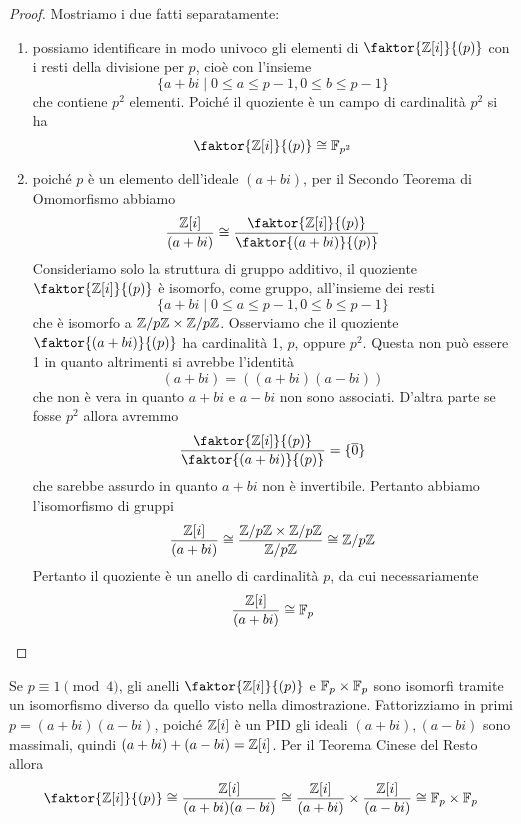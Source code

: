 \documentclass[11pt]{scrartcl}
\begin{document}
\begin{proof} 
    Mostriamo i due fatti separatamente:
    \begin{enumerate}[(1)]
        \item possiamo identificare in modo univoco gli elementi di 
        $\faktor{\ZZ[i]}{(p)}$ con i resti della divisione per $p$, cioè
        con l'insieme 
        \[
            \{a + bi \mid 0 \leq a \leq p - 1, 0 \leq b \leq p - 1\}
        \]
        che contiene $p^2$ elementi. Poiché il quoziente è un campo di cardinalità
        $p^2$ si ha
        \[
            \faktor{\ZZ[i]}{(p)}\cong \FF_{p^2}
        \]
        \item poiché $p$ è un elemento dell'ideale $(a + bi)$, per il 
        Secondo Teorema di Omomorfismo abbiamo 
        \[
            \frac{\ZZ[i]}{(a + bi)} \cong \frac{\faktor{\ZZ[i]}{(p)}}{\faktor{(a + bi)}{(p)}}
        \]
        Consideriamo solo la struttura di gruppo additivo, il quoziente 
        $\faktor{\ZZ[i]}{(p)}$ è isomorfo, come gruppo, all'insieme
        dei resti 
        \[
            \{a + bi \mid 0\leq a\leq p - 1, 0\leq b\leq p -1\}
        \]
        che è isomorfo a ${\mathbb Z}/p{\mathbb Z}\times{\mathbb Z}/p{\mathbb Z}$. Osserviamo che il quoziente
        $\faktor{(a + bi)}{(p)}$ ha cardinalità 1, $p$, oppure $p^2$. Questa 
        non può essere 1 in quanto altrimenti si avrebbe l'identità
        \[
            (a + bi) = ((a + bi)(a - bi))
        \]
        che non è vera in quanto $a + bi$ e $a - bi$ non sono associati. D'altra 
        parte se fosse $p^2$ allora avremmo
        \[
            \frac{\faktor{\ZZ[i]}{(p)}}{\faktor{(a + bi)}{(p)}} = \{\overline{0}\}
        \]
        che sarebbe assurdo in quanto $a + bi$ non è invertibile. Pertanto 
        abbiamo l'isomorfismo di gruppi
        \[
            \frac{\mathbb Z[i]}{(a + bi)} \cong \frac{{\mathbb Z}/p{\mathbb Z} \times {\mathbb Z}/p{\mathbb Z}}{{\mathbb Z}/p{\mathbb Z}} \cong {\mathbb Z}/p{\mathbb Z}
        \]
        Pertanto il quoziente è un anello di cardinalità $p$, da cui necessariamente
        \[
            \frac{\mathbb Z[i]}{(a + bi)} \cong \mathbb F_p
        \]
    \end{enumerate}
\end{proof}

\begin{remark}
    Se $p \equiv 1 \pmod 4$, gli anelli $\faktor{\ZZ[i]}{(p)}$ e $\mathbb F_p \times \mathbb F_p$
    sono isomorfi tramite un isomorfismo diverso da quello visto nella dimostrazione.
    Fattorizziamo in primi $p = (a + bi)(a - bi)$, poiché $\mathbb Z[i]$ è un PID
    gli ideali $(a + bi), (a - bi)$ sono massimali, quindi $(a + bi) + (a - bi) = \mathbb Z[i]$.
    Per il Teorema Cinese del Resto allora
    \[
        \faktor{\ZZ[i]}{(p)} \cong \frac{\ZZ[i]}{(a + bi)(a - bi)} \cong
        \frac{\ZZ[i]}{(a + bi)} \times \frac{\ZZ[i]}{(a - bi)} \cong \FF_p \times \FF_p
    \]
\end{remark}
\end{document}
